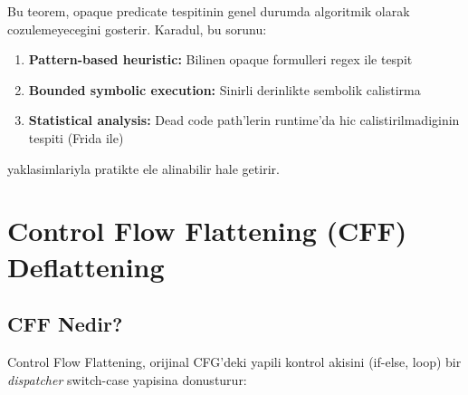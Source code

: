 Bu teorem, opaque predicate tespitinin genel durumda algoritmik olarak
cozulemeyecegini gosterir. Karadul, bu sorunu:
\begin{enumerate}
  \item \textbf{Pattern-based heuristic:} Bilinen opaque formulleri regex ile tespit
  \item \textbf{Bounded symbolic execution:} Sinirli derinlikte sembolik calistirma
  \item \textbf{Statistical analysis:} Dead code path'lerin runtime'da
        hic calistirilmadiginin tespiti (Frida ile)
\end{enumerate}
yaklasimlar\-iyla pratikte ele alinabilir hale getirir.


\section{Control Flow Flattening (CFF) Deflattening}
\label{sec:cff-deobfuscation}

\subsection{CFF Nedir?}

Control Flow Flattening, orijinal CFG'deki yapili kontrol akisini
(if-else, loop) bir \emph{dispatcher} switch-case yapisina donusturur:

